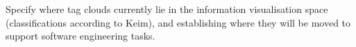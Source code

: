 
Specify where tag clouds currently lie in the information visualisation space (classifications according to Keim), and establishing where they will be moved to support software engineering tasks.


